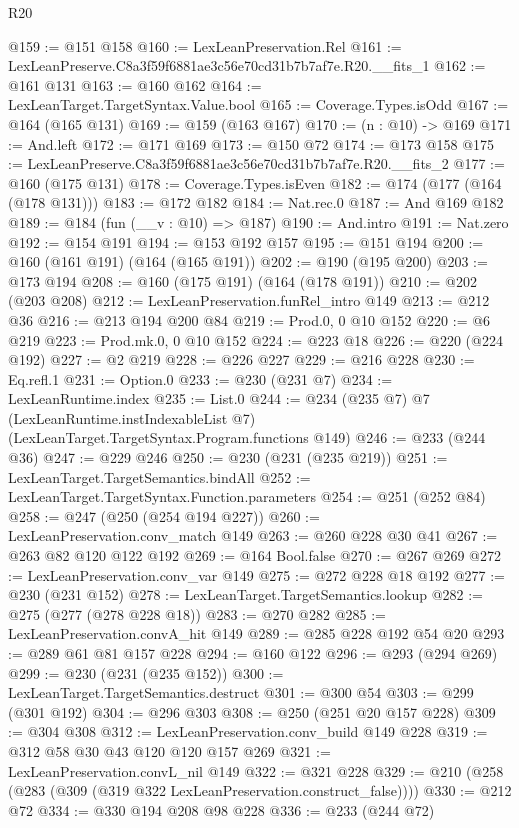 \begin{lexlean}{R20}
\begin{coremodule}
@159 := @151 @158
@160 := LexLeanPreservation.Rel
@161 := LexLeanPreserve.C8a3f59f6881ae3c56e70cd31b7b7af7e.R20.__fits_1
@162 := @161 @131
@163 := @160 @162
@164 := LexLeanTarget.TargetSyntax.Value.bool
@165 := Coverage.Types.isOdd
@167 := @164 (@165 @131)
@169 := @159 (@163 @167)
@170 := (n : @10) -> @169
@171 := And.left
@172 := @171 @169
@173 := @150 @72
@174 := @173 @158
@175 := LexLeanPreserve.C8a3f59f6881ae3c56e70cd31b7b7af7e.R20.__fits_2
@177 := @160 (@175 @131)
@178 := Coverage.Types.isEven
@182 := @174 (@177 (@164 (@178 @131)))
@183 := @172 @182
@184 := Nat.rec.{0}
@187 := And @169 @182
@189 := @184 (fun (__v : @10) => @187)
@190 := And.intro
@191 := Nat.zero
@192 := @154 @191
@194 := @153 @192 @157
@195 := @151 @194
@200 := @160 (@161 @191) (@164 (@165 @191))
@202 := @190 (@195 @200)
@203 := @173 @194
@208 := @160 (@175 @191) (@164 (@178 @191))
@210 := @202 (@203 @208)
@212 := LexLeanPreservation.funRel_intro @149
@213 := @212 @36
@216 := @213 @194 @200 @84
@219 := Prod.{0, 0} @10 @152
@220 := @6 @219
@223 := Prod.mk.{0, 0} @10 @152
@224 := @223 @18
@226 := @220 (@224 @192)
@227 := @2 @219
@228 := @226 @227
@229 := @216 @228
@230 := Eq.refl.{1}
@231 := Option.{0}
@233 := @230 (@231 @7)
@234 := LexLeanRuntime.index
@235 := List.{0}
@244 := @234
    (@235 @7)
    @7
    (LexLeanRuntime.instIndexableList @7)
    (LexLeanTarget.TargetSyntax.Program.functions @149)
@246 := @233 (@244 @36)
@247 := @229 @246
@250 := @230 (@231 (@235 @219))
@251 := LexLeanTarget.TargetSemantics.bindAll
@252 := LexLeanTarget.TargetSyntax.Function.parameters
@254 := @251 (@252 @84)
@258 := @247 (@250 (@254 @194 @227))
@260 := LexLeanPreservation.conv_match @149
@263 := @260 @228 @30 @41
@267 := @263 @82 @120 @122 @192
@269 := @164 Bool.false
@270 := @267 @269
@272 := LexLeanPreservation.conv_var @149
@275 := @272 @228 @18 @192
@277 := @230 (@231 @152)
@278 := LexLeanTarget.TargetSemantics.lookup
@282 := @275 (@277 (@278 @228 @18))
@283 := @270 @282
@285 := LexLeanPreservation.convA_hit @149
@289 := @285 @228 @192 @54 @20
@293 := @289 @61 @81 @157 @228
@294 := @160 @122
@296 := @293 (@294 @269)
@299 := @230 (@231 (@235 @152))
@300 := LexLeanTarget.TargetSemantics.destruct
@301 := @300 @54
@303 := @299 (@301 @192)
@304 := @296 @303
@308 := @250 (@251 @20 @157 @228)
@309 := @304 @308
@312 := LexLeanPreservation.conv_build @149 @228
@319 := @312 @58 @30 @43 @120 @120 @157 @269
@321 := LexLeanPreservation.convL_nil @149
@322 := @321 @228
@329 := @210 (@258 (@283 (@309 (@319 @322 LexLeanPreservation.construct_false))))
@330 := @212 @72
@334 := @330 @194 @208 @98 @228
@336 := @233 (@244 @72)

\end{coremodule}
\end{lexlean}
